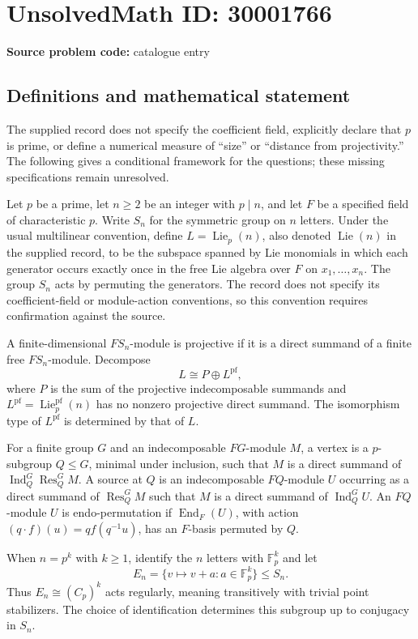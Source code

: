 \documentclass[11pt]{article}
\begin{document}
\section*{UnsolvedMath ID: 30001766}
\textbf{Source problem code:} catalogue entry
\subsection{Definitions and mathematical statement}
The supplied record does not specify the coefficient field, explicitly declare that \(p\) is prime, or define a numerical measure of ``size'' or ``distance from projectivity.'' The following gives a conditional framework for the questions; these missing specifications remain unresolved.

Let \(p\) be a prime, let \(n\geq 2\) be an integer with \(p\mid n\), and let \(F\) be a specified field of characteristic \(p\). Write \(S_n\) for the symmetric group on \(n\) letters. Under the usual multilinear convention, define \(L=\operatorname{Lie}_p(n)\), also denoted \(\operatorname{Lie}(n)\) in the supplied record, to be the subspace spanned by Lie monomials in which each generator occurs exactly once in the free Lie algebra over \(F\) on \(x_1,\ldots,x_n\). The group \(S_n\) acts by permuting the generators. The record does not specify its coefficient-field or module-action conventions, so this convention requires confirmation against the source.

A finite-dimensional \(FS_n\)-module is projective if it is a direct summand of a finite free \(FS_n\)-module. Decompose
\[
L\cong P\oplus L^{\mathrm{pf}},
\]
where \(P\) is the sum of the projective indecomposable summands and \(L^{\mathrm{pf}}=\operatorname{Lie}_p^{\mathrm{pf}}(n)\) has no nonzero projective direct summand. The isomorphism type of \(L^{\mathrm{pf}}\) is determined by that of \(L\).

For a finite group \(G\) and an indecomposable \(FG\)-module \(M\), a vertex is a \(p\)-subgroup \(Q\leq G\), minimal under inclusion, such that \(M\) is a direct summand of \(\operatorname{Ind}_Q^G\operatorname{Res}_Q^G M\). A source at \(Q\) is an indecomposable \(FQ\)-module \(U\) occurring as a direct summand of \(\operatorname{Res}_Q^G M\) such that \(M\) is a direct summand of \(\operatorname{Ind}_Q^G U\). An \(FQ\)-module \(U\) is endo-permutation if \(\operatorname{End}_F(U)\), with action \((q\cdot f)(u)=qf(q^{-1}u)\), has an \(F\)-basis permuted by \(Q\).

When \(n=p^k\) with \(k\geq 1\), identify the \(n\) letters with \(\mathbb F_p^k\) and let
\[
E_n=\{v\mapsto v+a:a\in\mathbb F_p^k\}\leq S_n.
\]
Thus \(E_n\cong(C_p)^k\) acts regularly, meaning transitively with trivial point stabilizers. The choice of identification determines this subgroup up to conjugacy in \(S_n\).
\end{document}
